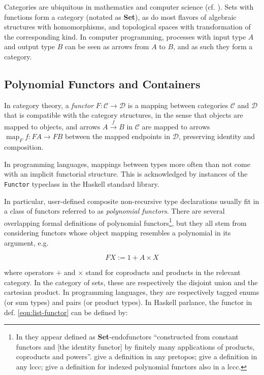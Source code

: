 \documentclass[a4paper]{article}
\DeclareMathOperator{\map}{map}
\newcommand{\catname}[1]{{\normalfont\textbf{#1}}}
\newcommand{\Set}{\catname{Set}}
\begin{document}
Categories are ubiquitous in mathematics and computer science (cf. \cite{Walters1992}). Sets with functions form a category (notated as \Set{}), as do most flavors of algebraic structures with homomorphisms, and topological spaces with transformation of the corresponding kind. In computer programming, processes with input type \(A\) and output type \(B\) can be seen as arrows from \(A\) to \(B\), and as such they form a category.

\subsection{Polynomial Functors and Containers}

In category theory, a \textit{functor} \(F : \mathcal C \to \mathcal D\) is a mapping between categories \(\mathcal C\) and \(\mathcal D\) that is compatible with the category structures, in the sense that objects are mapped to objects, and arrows \(A \xrightarrow{f} B\) in \(\mathcal C\) are mapped to arrows \(\map_F f : F A \to F B\) between the mapped endpoints in \(\mathcal D\), preserving identity and composition.

In programming languages, mappings between types more often than not come with an implicit functorial structure. This is acknowledged by instances of the \texttt{Functor} typeclass in the Haskell standard library.

In particular, user-defined composite non-recursive type declarations usually fit in a class of functors referred to as \textit{polynomial functors}. There are several overlapping formal definitions of polynomial functors\footnote{In \textcite{Goldblatt2001} they appear defined as \Set{}-endofunctors ``constructed from constant functors and [the identity functor] by finitely many applications of products, coproducts and powers''. \textcite{Moerdijk2000} give a definition in any pretopos; \textcite{Gambino2004} give a definition in any \gls{lccc}; \textcite{Gambino2009} give a definition for indexed polynomial functors also in a \gls{lccc}.}, but they all stem from considering functors whose object mapping resembles a polynomial in its argument, e.g.

\begin{equation}
	\label{eqn:list-functor}
	F X := 1 + A \times X
\end{equation}

\noindent where operators \(+\) and \(\times\) stand for coproducts and products in the relevant category. In the category of sets, these are respectively the disjoint union and the cartesian product. In programming languages, they are respectively tagged enums (or sum types) and pairs (or product types). In Haskell parlance, the functor in def. \ref{eqn:list-functor} can be defined by:
\end{document}
